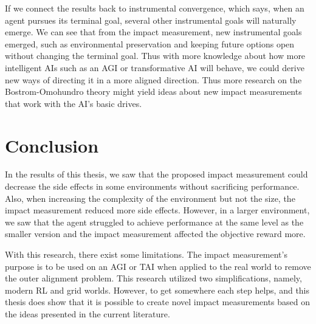 \documentclass[12pt,A4]{report}
\theoremstyle{definition}
\begin{document}
If we connect the results back to instrumental convergence, which says, when an agent pursues its terminal goal, several other instrumental goals will naturally emerge. We can see that from the impact measurement, new instrumental goals emerged, such as environmental preservation and keeping future options open without changing the terminal goal. Thus with more knowledge about how more intelligent AIs such as an AGI or transformative AI will behave, we could derive new ways of directing it in a more aligned direction. Thus more research on the Bostrom-Omohundro theory might yield ideas about new impact measurements that work with the AI's basic drives.



\chapter{Conclusion}





In the results of this thesis, we saw that the proposed impact measurement could decrease the side effects in some environments without sacrificing performance. Also, when increasing the complexity of the environment but not the size, the impact measurement reduced more side effects. However, in a larger environment, we saw that the agent struggled to achieve performance at the same level as the smaller version and the impact measurement affected the objective reward more. 

With this research, there exist some limitations. The impact measurement's purpose is to be used on an AGI or TAI when applied to the real world to remove the outer alignment problem. This research utilized two simplifications, namely, modern RL and grid worlds. However, to get somewhere each step helps, and this thesis does show that it is possible to create novel impact measurements based on the ideas presented in the current literature.
\end{document}
